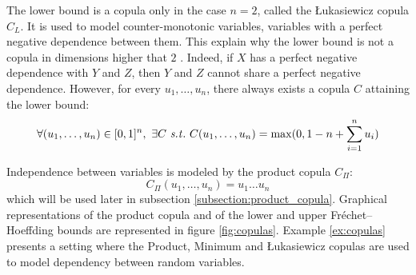 The lower bound is a copula only in the case $n=2$, called the \L ukasiewicz copula $C_L$. It is used to model counter-monotonic variables, \ie variables with a perfect negative dependence between them. This explain why the lower bound is not a copula in dimensions higher that $2$ . Indeed, if $X$ has a perfect negative dependence with $Y$ and $Z$, then $Y$ and $Z$ cannot share a perfect negative dependence. However, for every $u_1,\dots,u_n$, there always exists a copula $C$ attaining the lower bound:
\begin{eqnarray*}
    \forall (u_1,\dots,u_n)\in[0,1]^n,~\exists C \text{ \st }~C(u_1,\dots,u_n) = \max(0, 1-n+\sum_{i=1}^n u_i)
\end{eqnarray*}
 
Independence between variables is modeled by the product copula $C_\Pi$:
\begin{equation*}
    C_\Pi(u_1, \dots, u_n)=u_1\dots u_n
\end{equation*}
which will be used later in subsection \ref{subsection:product_copula}. Graphical representations of the product copula and of the lower and upper Fréchet–Hoeffding bounds are represented in figure \ref{fig:copulas}. Example \ref{ex:copulas} presents a setting where the Product, Minimum and \L ukasiewicz copulas are used to model dependency between random variables.

